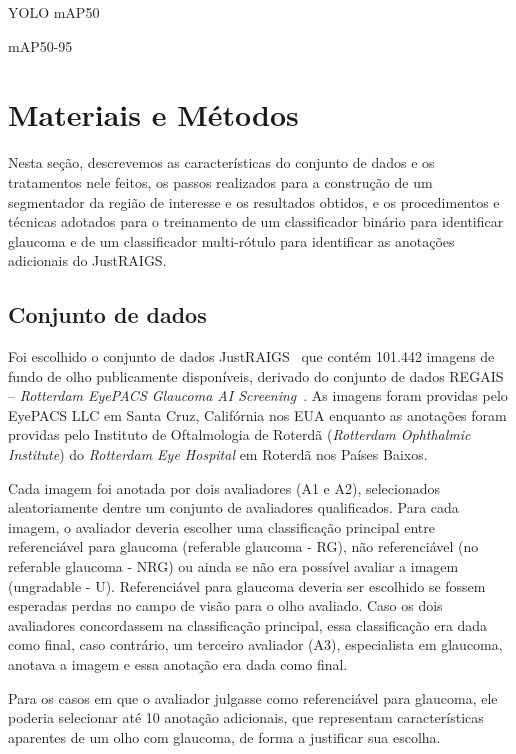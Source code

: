 \documentclass[12pt]{article}
\begin{document}
YOLO
mAP50

mAP50-95


\section{Materiais e Métodos}
\label{sec:methodology}

Nesta seção, descrevemos as características do conjunto de dados e os tratamentos nele feitos, os passos realizados para a construção de um segmentador da região de interesse e os resultados obtidos, e os procedimentos e técnicas adotados para o treinamento de um classificador binário para identificar glaucoma e de um classificador multi-rótulo para identificar as anotações adicionais do JustRAIGS.

\subsection{Conjunto de dados}
\label{sec:dataset}

Foi escolhido o conjunto de dados JustRAIGS~\cite{justraigs} que contém 101.442 imagens de fundo de olho publicamente disponíveis, derivado do conjunto de dados REGAIS – \emph{Rotterdam EyePACS Glaucoma AI Screening}~\cite{justraigs_article}. As imagens foram providas pelo EyePACS LLC em Santa Cruz, Califórnia nos EUA enquanto as anotações foram providas pelo Instituto de Oftalmologia de Roterdã (\emph{Rotterdam Ophthalmic Institute}) do \emph{Rotterdam Eye Hospital} em Roterdã nos Países Baixos.


Cada imagem foi anotada por dois avaliadores (A1 e A2), selecionados aleatoriamente dentre um conjunto de avaliadores qualificados. 
Para cada imagem, o avaliador deveria escolher uma classificação principal entre referenciável para glaucoma (referable glaucoma - RG), não referenciável (no referable glaucoma - NRG) ou ainda se não era possível avaliar a imagem (ungradable - U). Referenciável para glaucoma deveria ser escolhido se fossem esperadas perdas no campo de visão para o olho avaliado.
Caso os dois avaliadores concordassem na classificação principal, essa classificação era dada como final, caso contrário, um terceiro avaliador (A3), especialista em glaucoma, anotava a imagem e essa anotação era dada como final.~\cite{justraigs_article}

Para os casos em que o avaliador julgasse como referenciável para glaucoma, ele poderia selecionar até 10 anotação adicionais, que representam características aparentes de um olho com glaucoma, de forma a justificar sua escolha. \cite{justraigs_article}
\end{document}
